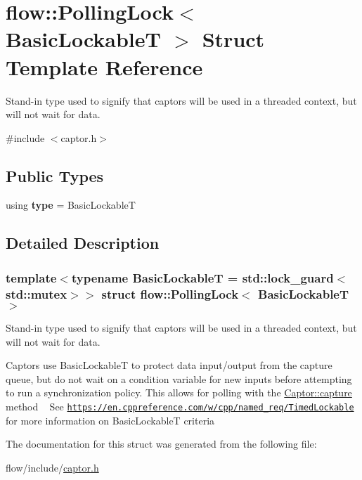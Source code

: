 \hypertarget{structflow_1_1_polling_lock}{}\section{flow\+:\+:Polling\+Lock$<$ Basic\+LockableT $>$ Struct Template Reference}
\label{structflow_1_1_polling_lock}


Stand-\/in type used to signify that captors will be used in a threaded context, but will not wait for data.  




{\ttfamily \#include $<$captor.\+h$>$}

\subsection*{Public Types}
\begin{DoxyCompactItemize}
\item 
\mbox{\label{structflow_1_1_polling_lock_a13f6fd935b4a81d59fba546fdfc9a70a}} 
using {\bfseries type} = Basic\+LockableT
\end{DoxyCompactItemize}


\subsection{Detailed Description}
\subsubsection*{template$<$typename Basic\+LockableT = std\+::lock\+\_\+guard$<$std\+::mutex$>$$>$\newline
struct flow\+::\+Polling\+Lock$<$ Basic\+Lockable\+T $>$}

Stand-\/in type used to signify that captors will be used in a threaded context, but will not wait for data. 

Captors use {\ttfamily Basic\+LockableT} to protect data input/output from the capture queue, but do not wait on a condition variable for new inputs before attempting to run a synchronization policy. This allows for polling with the {\ttfamily \hyperlink{classflow_1_1_captor_interface_ae95095d924214605bfeac70d0bd5ad35}{Captor\+::capture}} method ~\newline
 See \href{https://en.cppreference.com/w/cpp/named_req/TimedLockable}{\tt https\+://en.\+cppreference.\+com/w/cpp/named\+\_\+req/\+Timed\+Lockable} for more information on {\ttfamily Basic\+LockableT} criteria 

The documentation for this struct was generated from the following file\+:\begin{DoxyCompactItemize}
\item 
flow/include/\hyperlink{captor_8h}{captor.\+h}\end{DoxyCompactItemize}
